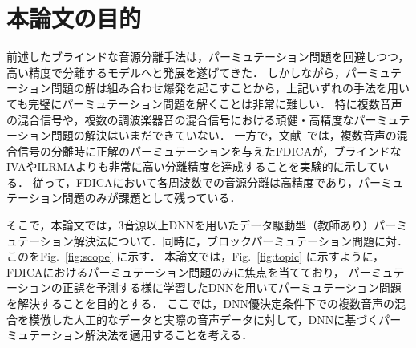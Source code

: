 \section{本論文の目的}
前述したブラインドな音源分離手法は，パーミュテーション問題を回避しつつ，高い精度で分離するモデルへと発展を遂げてきた．
しかしながら，パーミュテーション問題の解は組み合わせ爆発を起こすことから，上記いずれの手法を用いても完璧にパーミュテーション問題を解くことは非常に難しい．
特に複数音声の混合信号や，複数の調波楽器音の混合信号における頑健・高精度なパーミュテーション問題の解決はいまだできていない．
一方で，文献~\cite{EU}では，複数音声の混合信号の分離時に正解のパーミュテーションを与えたFDICAが，ブラインドなIVAやILRMAよりも非常に高い分離精度を達成することを実験的に示している．
従って，FDICAにおいて各周波数での音源分離は高精度であり，パーミュテーション問題のみが課題として残っている．

そこで，本論文では，3音源以上DNNを用いたデータ駆動型（教師あり）パーミュテーション解決法について．同時に，ブロックパーミュテーション問題に対．
このをFig.~\ref{fig:scope} に示す．
本論文では，Fig.~\ref{fig:topic} に示すように，FDICAにおけるパーミュテーション問題のみに焦点を当てており，
パーミュテーションの正誤を予測する様に学習したDNNを用いてパーミュテーション問題を解決することを目的とする．
ここでは，DNN優決定条件下での複数音声の混合を模倣した人工的なデータと実際の音声データに対して，DNNに基づくパーミュテーション解決法を適用することを考える．

